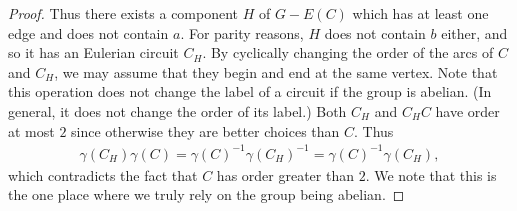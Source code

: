 \documentclass[a4paper, 12pt]{article}
\begin{document}
\begin{proof}
    Thus there exists a component $H$ of $G-E(C)$ which has at least one edge and does not contain $a$. For parity reasons, $H$ does not contain $b$ either, and so it has an Eulerian circuit $C_H$. By cyclically changing the order of the arcs of $C$ and $C_H$, we may assume that they begin and end at the same vertex. Note that this operation does not change the label of a circuit if the group is abelian. (In general, it does not change the order of its label.) Both $C_H$ and $C_HC$ have order at most $2$ since otherwise they are better choices than $C$. Thus \begin{align*}\gamma(C_H)\gamma(C)=\gamma(C)^{-1}\gamma(C_H)^{-1}=\gamma(C)^{-1}\gamma(C_H),
    \end{align*}which contradicts the fact that $C$ has order greater than $2$. We note that this is the one place where we truly rely on the group being abelian.
\end{proof}
\end{document}

